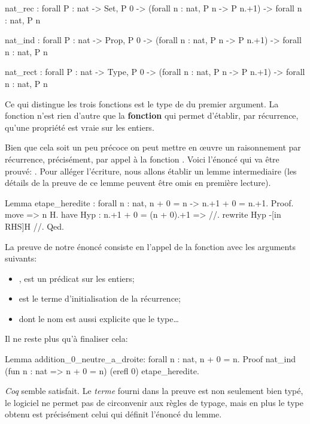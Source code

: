 \documentclass[a4paper,10pt]{article}
\begin{document}
\begin{coqout}{}{}
nat_rec
     : forall P : nat -> Set,
       P 0 -> (forall n : nat, P n -> P n.+1) -> forall n : nat, P n

nat_ind
     : forall P : nat -> Prop,
       P 0 -> (forall n : nat, P n -> P n.+1) -> forall n : nat, P n

nat_rect
     : forall P : nat -> Type,
       P 0 -> (forall n : nat, P n -> P n.+1) -> forall n : nat, P n
\end{coqout}

Ce qui distingue les trois fonctions est le type de du premier argument.  La fonction  n'est rien
d'autre que la \textbf{fonction} qui permet d'établir, par récurrence, qu'une propriété est vraie sur les entiers.

Bien que cela soit un peu précoce on peut mettre en œuvre un raisonnement par récurrence, précisément, par
appel à la fonction .  Voici l'énoncé qui va être prouvé: .  Pour
alléger l'écriture, nous allons établir un lemme intermediaire (les détails de la preuve de ce lemme peuvent
être omis en première lecture).

\begin{coq}[]
Lemma etape_heredite : forall n : nat, n + 0 = n -> n.+1 + 0 = n.+1.
Proof.
  move => n H.
  have Hyp : n.+1 + 0 = (n + 0).+1 => //.
  rewrite Hyp -[in RHS]H //.
Qed.
\end{coq}

La preuve de notre énoncé consiste en l'appel de la fonction  avec les arguments suivants:
\begin{itemize}
\item {},  est un prédicat sur les entiers;
\item {} est le terme d'initialisation de la récurrence;
\item {} dont le nom est aussi explicite que le
type\ldots{}
\end{itemize}

Il ne reste plus qu'à finaliser cela:

\begin{coq}[]
Lemma addition_0_neutre_a_droite: forall n : nat, n + 0 = n.
Proof nat_ind (fun n : nat => n + 0 = n) (erefl 0) etape_heredite.
\end{coq}

\emph{Coq} semble satisfait.  Le \emph{terme} fourni dans la preuve est non seulement bien typé, le logiciel
ne permet pas de circonvenir aux règles de typage, mais en plus le type obtenu est précisément celui
qui définit l'énoncé du lemme.
\end{document}
